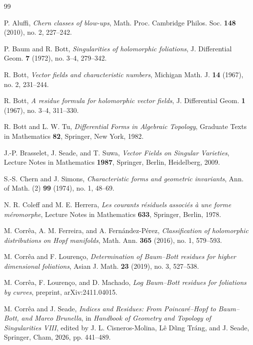 \documentclass[12pt,a4paper,dvipsnames,x11names]{amsart}
\numberwithin{equation}{section}
\theoremstyle{plain}
\theoremstyle{definition}
\theoremstyle{remark}
\begin{document}
\begin{thebibliography}{99}


P. Aluffi,
\emph{Chern classes of blow-ups},
Math. Proc. Cambridge Philos. Soc. \textbf{148} (2010), no. 2, 227--242.

P. Baum and R. Bott,
\emph{Singularities of holomorphic foliations},
J. Differential Geom. \textbf{7} (1972), no. 3--4, 279--342.

R. Bott,
\emph{Vector fields and characteristic numbers},
Michigan Math. J. \textbf{14} (1967), no. 2, 231--244.

R. Bott,
\emph{A residue formula for holomorphic vector fields},
J. Differential Geom. \textbf{1} (1967), no. 3--4, 311--330.

R. Bott and L. W. Tu,
\emph{Differential Forms in Algebraic Topology},
Graduate Texts in Mathematics \textbf{82},
Springer, New York, 1982.

J.-P. Brasselet, J. Seade, and T. Suwa,
\emph{Vector Fields on Singular Varieties},
Lecture Notes in Mathematics \textbf{1987},
Springer, Berlin, Heidelberg, 2009.

S.-S. Chern and J. Simons,
\emph{Characteristic forms and geometric invariants},
Ann. of Math. (2) \textbf{99} (1974), no. 1, 48--69.

N. R. Coleff and M. E. Herrera,
\emph{Les courants r\'esiduels associ\'es \`a une forme m\'eromorphe},
Lecture Notes in Mathematics \textbf{633},
Springer, Berlin, 1978.

M. Corr\^ea, A. M. Ferreira, and A. Fern\'andez-P\'erez,
\emph{Classification of holomorphic distributions on Hopf manifolds},
Math. Ann. \textbf{365} (2016), no. 1, 579--593.

M. Corr\^ea and F. Louren\c{c}o,
\emph{Determination of Baum--Bott residues for higher dimensional foliations},
Asian J. Math. \textbf{23} (2019), no. 3, 527--538.

M. Corr\^ea, F. Louren\c{c}o, and D. Machado,
\emph{Log Baum--Bott residues for foliations by curves},
preprint, arXiv:2411.04015.

M. Corr\^ea and J. Seade,
\emph{Indices and Residues: From Poincar\'e--Hopf to Baum--Bott, and Marco Brunella},
in \emph{Handbook of Geometry and Topology of Singularities VIII},
edited by J. L. Cisneros-Molina, L\^e D\~ung Tr\'ang, and J. Seade,
Springer, Cham, 2026, pp. 441--489.


\end{thebibliography}
\end{document}

